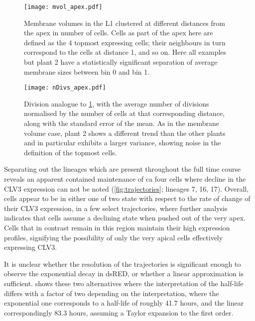 
 \begin{figure}[H]
   \centering
   \texttt{[image: mvol\_apex.pdf]}
   \caption[Membrane volume clustering]{Membrane volumes in the L1 clustered at different distances from the apex in
     number of cells. Cells as part of the apex here are defined as the 4
     topmost expressing cells; their neighbours in turn correspond to the cells
     at distance 1, and so on. Here all examples but plant 2 have a
     statistically significant separation of average membrane sizes between bin
     0 and bin 1.}
  \label{fig:mvol_apex}
\end{figure}

\begin{figure}[H]
   \centering
   \texttt{[image: nDivs\_apex.pdf]}
   \caption[Division rate clustering]{Division analogue to \cref{fig:mvol_apex}, with the average number of
     divisions normalised by the number of cells at that corresponding
     distance, along with the standard error of the mean. As in the membrane
     volume case, plant 2 shows a different trend  
     than the other plants and in particular exhibits a larger variance,
     showing noise in the definition of the topmost cells. 
   }  
   \label{fig:nDivs_apex}
\end{figure}

Separating out the lineages which are present throughout the full time course
reveals an apparent contained maintenance of ca four cells where decline in the
CLV3 expression can not be noted (\cref{fig:trajectories}; lineages 7, 16,
17). Overall, cells appear to be in either one of two state with respect to
the rate of change of their CLV3 expression, in a few select trajectories, where
further analysis indicates that cells  
assume a declining state when pushed out of the very apex. Cells that in
contrast remain in this region maintain their high expression profiles,
signifying the possibility of only the very apical cells effectively expressing
CLV3. 

It is unclear whether the resolution of the trajectories is significant
enough to observe the exponential decay in dsRED, or whether a linear
approximation is sufficient.  shows these two alternatives
where the interpretation of the half-life differs with a factor of two depending
on the interpretation, where the exponential one corresponds to a half-life of
roughly 41.7 hours, and the linear correspondingly 83.3 hours, assuming a Taylor
expansion to the first order. 


